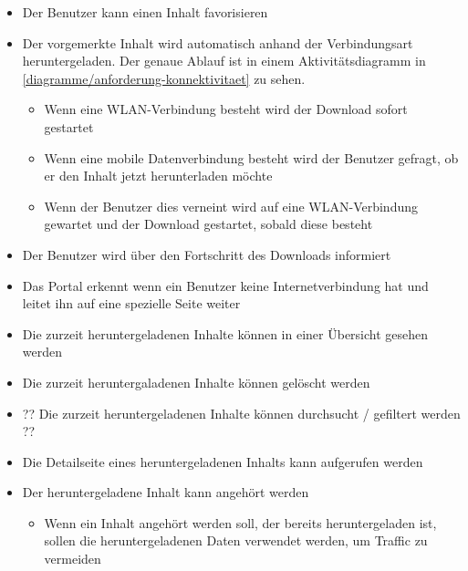 \begin{itemize}
	\item Der Benutzer kann einen Inhalt favorisieren
	\item Der vorgemerkte Inhalt wird automatisch anhand der Verbindungsart heruntergeladen. Der genaue Ablauf ist in einem Aktivitätsdiagramm in \autoref{diagramme/anforderung-konnektivitaet} zu sehen.
	
	\begin{itemize}
		\item Wenn eine WLAN-Verbindung besteht wird der Download sofort gestartet
		\item Wenn eine mobile Datenverbindung besteht wird der Benutzer gefragt, ob er den Inhalt jetzt herunterladen möchte
		\item Wenn der Benutzer dies verneint wird auf eine WLAN-Verbindung gewartet und der Download gestartet, sobald diese besteht
	\end{itemize}
	

	\item Der Benutzer wird über den Fortschritt des Downloads informiert
	\item Das Portal erkennt wenn ein Benutzer keine Internetverbindung hat und leitet ihn auf eine spezielle Seite weiter
	\item Die zurzeit heruntergeladenen Inhalte können in einer Übersicht gesehen werden
 	\item Die zurzeit heruntergaladenen Inhalte können gelöscht werden
	\item ?? Die zurzeit heruntergeladenen Inhalte können durchsucht / gefiltert werden ??
	\item Die Detailseite eines heruntergeladenen Inhalts kann aufgerufen werden 
	\item Der heruntergeladene Inhalt kann angehört werden
	\begin{itemize}
		\item Wenn ein Inhalt angehört werden soll, der bereits heruntergeladen ist, sollen die heruntergeladenen Daten verwendet werden, um Traffic zu vermeiden
	\end{itemize}
	
\end{itemize}
